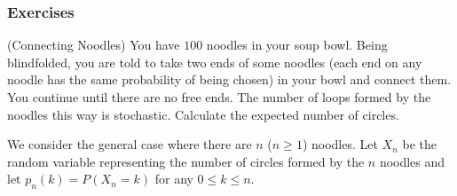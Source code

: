 \documentclass[12pt,letterpaper, onecolumn]{exam}
\begin{document}
    \subsubsection{Exercises}
    \begin{questions}
        \question[](Connecting Noodles) You have $100$ noodles in your soup bowl. Being blindfolded, you are told to take two ends of some noodles (each end on any noodle has the same probability of being chosen) in your bowl and connect them. You continue until there are no free ends. The number of loops formed by the noodles this way is stochastic. Calculate the expected number of circles.
        \begin{solution}
            We consider the general case where there are $n$ ($n\ge 1$) noodles. Let $X_n$ be the random variable representing the number of circles formed by the $n$ noodles and let $p_n(k)=P(X_n=k)$ for any $0\le k\le n$. 
            

\end{solution}
\end{questions}
\end{document}
